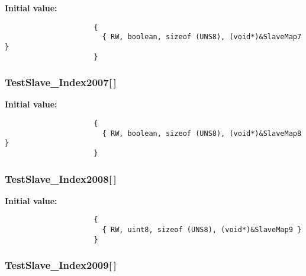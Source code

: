 \textbf{Initial value:}

\begin{Code}\begin{verbatim} 
                     {
                       { RW, boolean, sizeof (UNS8), (void*)&SlaveMap7 }
                     }
\end{verbatim}\end{Code}
\subsubsection{ {\bf Test\-Slave\_\-Index2007}[$\,$]}\label{TestSlave_8c_77c3160e7dd57e319984a31bcf8784e8}


\textbf{Initial value:}

\begin{Code}\begin{verbatim} 
                     {
                       { RW, boolean, sizeof (UNS8), (void*)&SlaveMap8 }
                     }
\end{verbatim}\end{Code}
\subsubsection{ {\bf Test\-Slave\_\-Index2008}[$\,$]}\label{TestSlave_8c_7c52a18cba9fa2fa48c13d2f0a1d5b2f}


\textbf{Initial value:}

\begin{Code}\begin{verbatim} 
                     {
                       { RW, uint8, sizeof (UNS8), (void*)&SlaveMap9 }
                     }
\end{verbatim}\end{Code}
\subsubsection{ {\bf Test\-Slave\_\-Index2009}[$\,$]}\label{TestSlave_8c_1ff20f1e6660d82f75e3d0734964bf54}


